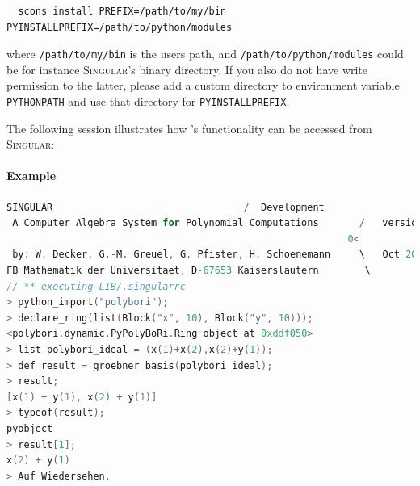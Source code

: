 \begin{lstlisting}
  scons install PREFIX=/path/to/my/bin PYINSTALLPREFIX=/path/to/python/modules
\end{lstlisting}

where \texttt{/path/to/my/bin} is the users path, and \texttt{/path/to/python/modules}
could be for instance \textsc{Singular}'s binary directory. If you also do not have write
permission to the latter, please add a custom directory to environment
variable \texttt{PYTHONPATH} and use that directory for \texttt{PYINSTALLPREFIX}.

The following session illustrates how \PolyBoRi's functionality can be accessed
from \textsc{Singular}:

\paragraph{Example}
\begin{lstlisting}[language=C]
                     SINGULAR                                 /  Development
 A Computer Algebra System for Polynomial Computations       /   version 3-1-2
                                                           0<
 by: W. Decker, G.-M. Greuel, G. Pfister, H. Schoenemann     \   Oct 2010
FB Mathematik der Universitaet, D-67653 Kaiserslautern        \
// ** executing LIB/.singularrc
> python_import("polybori");
> declare_ring(list(Block("x", 10), Block("y", 10)));
<polybori.dynamic.PyPolyBoRi.Ring object at 0xddf050>
> list polybori_ideal = (x(1)+x(2),x(2)+y(1));
> def result = groebner_basis(polybori_ideal);
> result;
[x(1) + y(1), x(2) + y(1)]
> typeof(result);
pyobject
> result[1];
x(2) + y(1)
> Auf Wiedersehen.
\end{lstlisting}